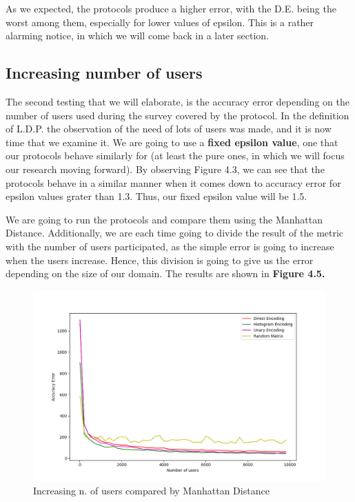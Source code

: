 As we expected, the protocols produce a higher error, with the D.E. being the worst among them, especially for lower values of epsilon. This is a rather alarming notice, in which we will come back in a later section.


\subsection{Increasing number of users}


The second testing that we will elaborate, is the accuracy error depending on the number of users used during the survey covered by the protocol. In the definition of L.D.P. the observation of the need of lots of users was made, and it is now time that we examine it. We are going to use a \textbf{fixed epsilon value}, one that our protocols behave similarly for (at least the pure ones, in which we will focus our research moving forward). By observing Figure 4.3, we can see that the protocols behave in a similar manner when it comes down to accuracy error for epsilon values grater than 1.3. Thus, our fixed epsilon value will be 1.5.

We are going to run the protocols and compare them using the Manhattan Distance. Additionally, we are each time going to divide the result of the metric with the number of users participated, as the simple error is going to increase when the users increase. Hence, this division is going to give us the error depending on the size of our domain. The results are shown in \textbf{Figure 4.5.}

\begin{figure}[!htb]\centering
    \includegraphics[width=1\textwidth]{images/nusers_others_l1.png}
    \caption{Increasing n. of users compared by Manhattan Distance}
\end{figure}

